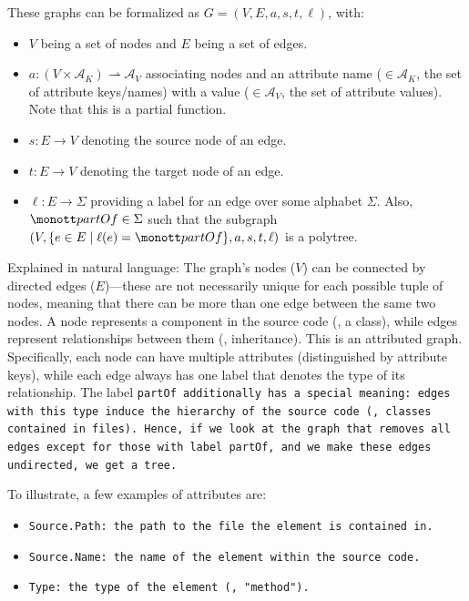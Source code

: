 \documentclass[../thesis]{subfiles}
\begin{document}
These graphs can be formalized as $G = (V, E, a, s, t, \ell)$, with:
\begin{itemize}
	\item $V$ being a set of nodes and $E$ being a set of edges.
	\item $a: (V \times \mathcal{A}_K) \rightharpoonup \mathcal{A}_V$ associating nodes and an attribute name ($\in \mathcal{A}_{K}$, the set of attribute keys/names) with a value ($\in \mathcal{A}_{V}$, the set of attribute values). Note that this is a partial function.
	\item $s: E \rightarrow V$ denoting the source node of an edge.
	\item $t: E \rightarrow V$ denoting the target node of an edge.
	\item $\ell: E \rightarrow \Sigma$ providing a label for an edge over some alphabet $\Sigma$.
	      Also, $\tt{partOf} \in \Sigma$ such that the subgraph $(V, \{e \in E \mid \ell(e) = \tt{partOf}\}, a, s, t, \ell)$ is a \gls{polytree}.
\end{itemize}

Explained in natural language:
The graph's nodes ($V$) can be connected by directed edges ($E$)---these are not necessarily unique for each possible tuple of nodes, meaning that there can be more than one edge between the same two nodes.
A node represents a component in the source code (\eg, a class), while edges represent relationships between them (\eg, inheritance).
This is an attributed graph.
Specifically, each node can have multiple attributes (distinguished by attribute keys), while each edge always has one label that denotes the type of its relationship.
The label \tt{partOf} additionally has a special meaning: edges with this type induce the hierarchy of the source code (\eg, classes contained in files).
Hence, if we look at the graph that removes all edges except for those with label \tt{partOf}, and we make these edges undirected, we get a tree.

To illustrate, a few examples of attributes are:
\begin{itemize}
	\item \tt{Source.Path}: the path to the file the element is contained in.
	\item \tt{Source.Name}: the name of the element within the source code.
	\item \tt{Type}: the type of the element (\eg{}, "method").
\end{itemize}
\end{document}
